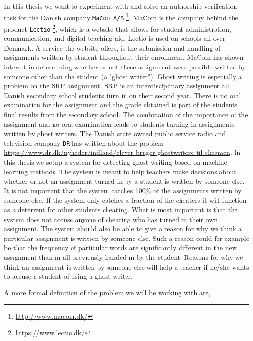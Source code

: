 
In this thesis we want to experiment with and solve an authorship
verification task for the Danish company \texttt{MaCom A/S}
\footnote{\url{http://www.macom.dk/}}. MaCom is the company behind the
product \texttt{Lectio} \footnote{\url{https://www.lectio.dk/}}, which is a
website that allows for student administration, communication, and digital
teaching aid. Lectio is used on schools all over Denmark. A service the
website offers, is the submission and handling of assignments written by
student throughout their enrollment. MaCom has shown interest in determining
whether or not these assignment were possible written by someone other than
the student (a "ghost writer"). Ghost writing is especially a problem on
the \gls{SRP} assignment. \gls{SRP} is an interdisciplinary assignment all
Danish secondary school students turn in on their second year. There is
no oral examination for the assignment and the grade obtained is part of
the students final results from the secondary school. The combination of
the importance of the assignment and no oral examination leads to students
turning in assignments written by ghost writers. The Danish state owned public
service radio and television company \texttt{DR} has written about the problem
\url{https://www.dr.dk/nyheder/indland/elever-bruger-ghostwritere-til-eksamen}.
In this thesis we setup a system for detecting ghost writing based on machine
learning methods. The system is meant to help teachers make decisions about
whether or not an assignment turned in by a student is written by someone else.
It is not important that the system catches 100\% of the assignments written by
someone else. If the system only catches a fraction of the cheaters it will
function as a deterrent for other students cheating. What is most important is
that the system does not accuse anyone of cheating who has turned in their own
assignment. The system should also be able to give a reason for why we think a
particular assignment is written by someone else. Such a reason could for
example be that the frequency of particular words are significantly different in
the new assignment than in all previously handed in by the student. Reasons for
why we think an assignment is written by someone else will help a teacher if
he/she wants to accuse a student of using a ghost writer.


A more formal definition of the problem we will be working with are,



